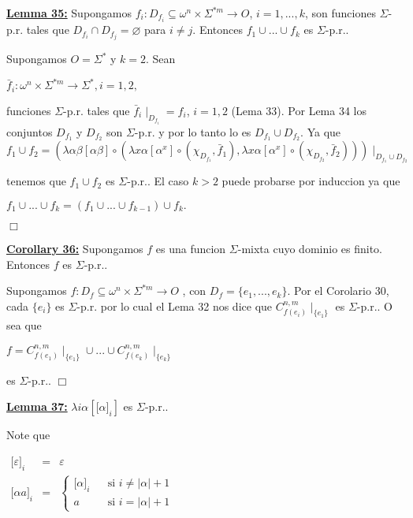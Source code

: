 \textbf{\underline{Lemma 35:}} Supongamos \(f_{i}:D_{f_{i}}\subseteq \omega ^{n}\times \Sigma ^{\ast m}\rightarrow O\), \(i=1,...,k\), son funciones \(\Sigma \)-p.r. tales que \(D_{f_{i}}\cap D_{f_{j}}=\varnothing \) para \(i\neq j.\) Entonces \(f_{1}\cup ...\cup f_{k}\) es \(\Sigma \)-p.r..

\PROOF Supongamos \(O=\Sigma ^{\ast }\) y \(k=2.\) Sean

\(\displaystyle \bar{f}_{i}:\omega ^{n}\times \Sigma ^{\ast m}\rightarrow \Sigma ^{\ast },i=1,2, \)

funciones \(\Sigma \)-p.r. tales que \(\bar{f}_{i}\mid _{D_{f_{i}}}=f_{i}\), \( i=1,2\) (Lema 33)\(.\) Por Lema 34 los conjuntos \(D_{f_{1}}\) y \(D_{f_{2}}\) son \(\Sigma \)-p.r. y por lo tanto lo es \( D_{f_{1}}\cup D_{f_{2}}\). Ya que
\(\displaystyle f_{1}\cup f_{2}=\left( \lambda \alpha \beta \left[ \alpha \beta \right] \circ (\lambda x\alpha \left[ \alpha ^{x}\right] \circ (\chi _{D_{f_{1}}}, \bar{f}_{1}),\lambda x\alpha \left[ \alpha ^{x}\right] \circ (\chi _{D_{f_{2}}},\bar{f}_{2}))\right) \mid _{D_{f_{1}}\cup D_{f_{2}}} \)

tenemos que \(f_{1}\cup f_{2}\) es \(\Sigma \)-p.r..
El caso \(k >2\) puede probarse por induccion ya que

\(\displaystyle f_{1}\cup ...\cup f_{k}=(f_{1}\cup ...\cup f_{k-1})\cup f_{k}. \)

\(\Box\)


\textbf{\underline{Corollary 36:}} Supongamos \(f\) es una funcion \(\Sigma \)-mixta cuyo dominio es finito. Entonces \(f\) es \(\Sigma \)-p.r..

\PROOF Supongamos \(f:D_{f}\subseteq \omega ^{n}\times \Sigma ^{\ast m}\rightarrow O\) , con \(D_{f}=\{e_{1},...,e_{k}\}\). Por el Corolario 30, cada \( \{e_{i}\}\) es \(\Sigma \)-p.r. por lo cual el Lema 32 nos dice que \(C_{f(e_{i})}^{n,m}\mid _{\{e_{1}\}}\) es \(\Sigma \)-p.r.. O sea que

\(\displaystyle f=C_{f(e_{1})}^{n,m}\mid _{\{e_{1}\}}\cup ...\cup C_{f(e_{k})}^{n,m}\mid _{\{e_{k}\}} \)

es \(\Sigma \)-p.r.. \(\Box\)


\textbf{\underline{Lemma 37:}} \(\lambda i\alpha \left[ \lbrack \alpha ]_{i}\right] \) es \(\Sigma \)-p.r..

\PROOF Note que

\(\displaystyle \begin{array}{rcl} \lbrack \varepsilon ]_{i} & =& \varepsilon \\ \lbrack \alpha a]_{i} & =& \left\{ \begin{array}{lll} \lbrack \alpha ]_{i} & & \text{si }i\neq \left\vert \alpha \right\vert +1 \\ a & & \text{si }i=\left\vert \alpha \right\vert +1 \end{array} \right. \end{array} \)

